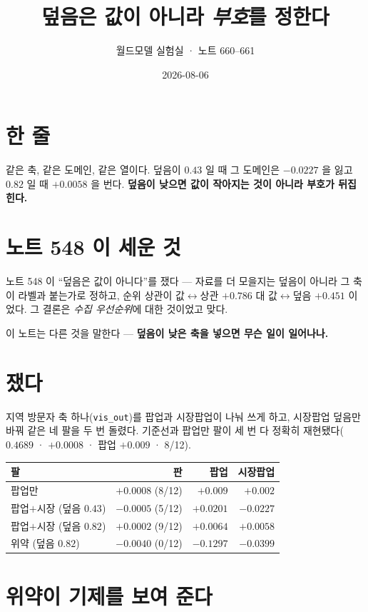 \documentclass[10pt,a4paper]{article}
\title{\bfseries 덮음은 값이 아니라 \emph{부호}를 정한다}
\author{월드모델 실험실 · 노트 660--661}
\date{2026-08-06}
\begin{document}
\maketitle

\section{한 줄}

같은 축, 같은 도메인, 같은 열이다. 덮음이 $0.43$ 일 때 그 도메인은 $-0.0227$ 을
잃고 $0.82$ 일 때 $+0.0058$ 을 번다. \textbf{덮음이 낮으면 값이 작아지는 것이
아니라 부호가 뒤집힌다.}

\section{노트 548 이 세운 것}

노트 548 이 ``덮음은 값이 아니다''를 쟀다 --- 자료를 더 모을지는 덮음이 아니라
그 축이 라벨과 붙는가로 정하고, 순위 상관이 값$\leftrightarrow$상관 $+0.786$ 대
값$\leftrightarrow$덮음 $+0.451$ 이었다. 그 결론은 \emph{수집 우선순위}에 대한
것이었고 맞다.

이 노트는 다른 것을 말한다 --- \textbf{덮음이 낮은 축을 넣으면 무슨 일이
일어나나.}

\section{쟀다}

지역 방문자 축 하나(\verb|vis_out|)를 팝업과 시장팝업이 나눠 쓰게 하고, 시장팝업
덮음만 바꿔 같은 네 팔을 두 번 돌렸다. 기준선과 팝업만 팔이 세 번 다 정확히
재현됐다($0.4689$ · $+0.0008$ · 팝업 $+0.009$ · 8/12).

\begin{center}\small
\begin{tabular}{lrrr}\toprule
팔 & 판 & 팝업 & 시장팝업 \\ \midrule
팝업만 & $+0.0008$ (8/12) & $+0.009$ & $+0.002$ \\
팝업$+$시장 (덮음 $0.43$) & $-0.0005$ (5/12) & $+0.0201$ & $\mathbf{-0.0227}$ \\
팝업$+$시장 (덮음 $\mathbf{0.82}$) & $+0.0002$ (9/12) & $+0.0064$ & $\mathbf{+0.0058}$ \\
위약 (덮음 $0.82$) & $-0.0040$ (0/12) & $-0.1297$ & $-0.0399$ \\ \bottomrule
\end{tabular}\end{center}

\section{위약이 기제를 보여 준다}
\end{document}
